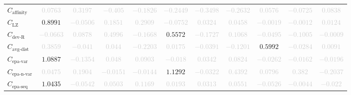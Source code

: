 \documentclass{standalone}
\newcommand{\lempelzivname}{\text{LZ}}
\newcommand{\lempelziv}{C_{\lempelzivname}}
\newcommand{\affinityname}{\text{affinity}}
\newcommand{\affinity}{C_{\affinityname}}
\newcommand{\deviationfromrandomname}{\text{dev-R}}
\newcommand{\deviationfromrandom}{C_{\deviationfromrandomname}}
\newcommand{\avgdistname}{\text{avg-dist}}
\newcommand{\avgdist}{C_{\avgdistname}}
\newcommand{\epavariantname}{\text{epa-var}}
\newcommand{\epavariant}{C_{\epavariantname}}
\newcommand{\epanormvariantname}{\text{epa-n-var}}
\newcommand{\epanormvariant}{C_{\epanormvariantname}}
\newcommand{\epasequencename}{\text{epa-seq}}
\newcommand{\epasequence}{C_{\epasequencename}}
\begin{document}
\begin{tabular}{lcccccccccc}
$\affinity$ & \textcolor{lightgray}{$0.0763$} & \textcolor{lightgray}{$0.3197$} & \textcolor{lightgray}{$-0.405$} & \textcolor{lightgray}{$-0.1826$} & \textcolor{lightgray}{$-0.2449$} & \textcolor{lightgray}{$-0.3498$} & \textcolor{lightgray}{$-0.2632$} & \textcolor{lightgray}{$0.0576$} & \textcolor{lightgray}{$-0.0725$} & \textcolor{lightgray}{$0.0838$} \\ 
$\lempelziv$ & $0.8991$ & \textcolor{lightgray}{$-0.0506$} & \textcolor{lightgray}{$0.1851$} & \textcolor{lightgray}{$0.2909$} & \textcolor{lightgray}{$-0.0752$} & \textcolor{lightgray}{$0.0324$} & \textcolor{lightgray}{$0.0458$} & \textcolor{lightgray}{$-0.0019$} & \textcolor{lightgray}{$-0.0012$} & \textcolor{lightgray}{$0.0124$} \\ 
$\deviationfromrandom$ & \textcolor{lightgray}{$-0.0663$} & \textcolor{lightgray}{$0.0878$} & \textcolor{lightgray}{$0.4996$} & \textcolor{lightgray}{$-0.1668$} & $0.5572$ & \textcolor{lightgray}{$-0.1727$} & \textcolor{lightgray}{$0.1068$} & \textcolor{lightgray}{$-0.0495$} & \textcolor{lightgray}{$-0.1005$} & \textcolor{lightgray}{$-0.0009$} \\ 
$\avgdist$ & \textcolor{lightgray}{$0.3859$} & \textcolor{lightgray}{$-0.041$} & \textcolor{lightgray}{$0.044$} & \textcolor{lightgray}{$-0.2203$} & \textcolor{lightgray}{$0.0175$} & \textcolor{lightgray}{$-0.0391$} & \textcolor{lightgray}{$-0.1201$} & $0.5992$ & \textcolor{lightgray}{$-0.0284$} & \textcolor{lightgray}{$0.0091$} \\ 
$\epavariant$ & $1.0887$ & \textcolor{lightgray}{$-0.1354$} & \textcolor{lightgray}{$0.048$} & \textcolor{lightgray}{$0.0903$} & \textcolor{lightgray}{$-0.018$} & \textcolor{lightgray}{$0.0342$} & \textcolor{lightgray}{$0.0824$} & \textcolor{lightgray}{$-0.0262$} & \textcolor{lightgray}{$-0.0162$} & \textcolor{lightgray}{$-0.0196$} \\ 
$\epanormvariant$ & \textcolor{lightgray}{$0.0475$} & \textcolor{lightgray}{$0.1904$} & \textcolor{lightgray}{$-0.0151$} & \textcolor{lightgray}{$-0.0144$} & $1.1292$ & \textcolor{lightgray}{$-0.0322$} & \textcolor{lightgray}{$0.4392$} & \textcolor{lightgray}{$0.0796$} & \textcolor{lightgray}{$0.382$} & \textcolor{lightgray}{$-0.2037$} \\ 
$\epasequence$ & $1.0435$ & \textcolor{lightgray}{$-0.0542$} & \textcolor{lightgray}{$0.0503$} & \textcolor{lightgray}{$0.1169$} & \textcolor{lightgray}{$0.0193$} & \textcolor{lightgray}{$0.0313$} & \textcolor{lightgray}{$0.0551$} & \textcolor{lightgray}{$-0.0526$} & \textcolor{lightgray}{$-0.0044$} & \textcolor{lightgray}{$-0.022$} \\ 

\end{tabular}
\end{document}
